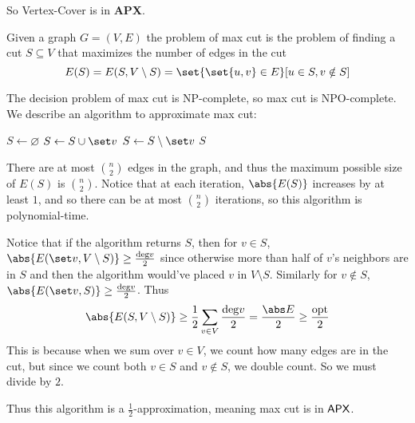 \edefn

So Vertex-Cover is in {\bf APX}.

\bprob

    Given a graph $G=(V,E)$ the problem of {\emphcolor max cut} is the problem of finding a cut $S\subseteq V$ that maximizes the number of edges in the cut
    $$ E(S) = E(S,V\setminus S) = \set{\set{u,v}\in E}[u\in S,v\notin S] $$

\eprob

The decision problem of max cut is NP-complete, so max cut is NPO-complete.
We describe an algorithm to approximate max cut:

\algorithm
        \State $S\gets\varnothing$
                \State $S\gets S\cup\set v$
                \State $S\gets S\setminus\set v$
            \Else
                \State \Return $S$
            \EndIf
        \EndWhile
    \EndFunc
\ealgorithm

There are at most $\binom n2$ edges in the graph, and thus the maximum possible size of $E(S)$ is $\binom n2$.
Notice that at each iteration, $\abs{E(S)}$ increases by at least $1$, and so there can be at most $\binom n2$ iterations, so this algorithm is polynomial-time.

Notice that if the algorithm returns $S$, then for $v\in S$, $\abs{E(\set v,V\setminus S)}\geq\frac{{\rm deg}v}2$ since otherwise more than half of $v$'s neighbors are in $S$ and then the algorithm would've
placed $v$ in $V\setminus S$.
Similarly for $v\notin S$, $\abs{E(\set v,S)}\geq\frac{{\rm deg}v}2$.
Thus
$$ \abs{E(S,V\setminus S)} \geq \frac12\sum_{v\in V}\frac{{\rm deg}v}2 = \frac{\abs E}2 \geq \frac{\rm opt}2 $$
This is because when we sum over $v\in V$, we count how many edges are in the cut, but since we count both $v\in S$ and $v\notin S$, we double count.
So we must divide by $2$.

Thus this algorithm is a $\frac12$-approximation, meaning max cut is in ${\sf APX}$.
